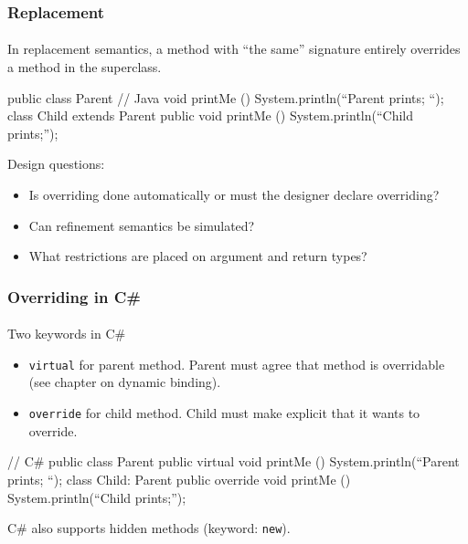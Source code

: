 \documentclass{beamer}
\begin{document}
\begin{frame}[fragile]
\frametitle{Replacement}
\framesubtitle{}
In replacement semantics, a method with ``the same'' signature 
entirely overrides a method in the superclass. 
\bigskip

\begin{java}
public class Parent {	 // Java 
 void printMe () {	  
       System.println(``Parent prints; ``);	 
  }
}
class Child extends Parent { 
    public void printMe () {
       System.println(``Child prints;''); 
    }
}
\end{java}
Design questions:
\begin{itemize}
\item Is overriding done automatically or must the designer
declare overriding?
\item Can refinement semantics be simulated?
\item %
What restrictions are placed on argument and return types?
\end{itemize}


\end{frame}

\begin{frame}[fragile]
\frametitle{Overriding in C\#}
\framesubtitle{}
Two keywords in C\#
\begin{itemize}
\item \texttt{virtual} for parent method. 
Parent must agree that method is overridable  (see chapter on dynamic binding).
\item \texttt{override} for child method. 
Child must make explicit that it wants to override. 
\end{itemize}
\begin{java}
// C#
public class Parent {			
   public virtual void printMe () {	  
       System.println(``Parent prints; ``);	 
  }
}
class Child:  Parent { 
    public override void printMe () {
       System.println(``Child prints;''); 
    }
}
\end{java}

C\# also supports hidden methods (keyword: \texttt{new}).

\end{frame}
\end{document}
